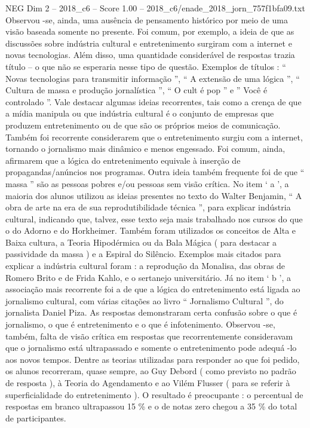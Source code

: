 \begin{textsample}{NEG Dim 2 – 2018\_c6 – Score 1.00 – 2018\_c6/enade\_2018\_jorn\_757f1bfa09.txt}
Observou -se, ainda, uma ausência de pensamento histórico por meio de uma visão baseada somente no presente.
Foi comum, por exemplo, a ideia de que as discussões sobre indústria cultural e entretenimento surgiram com a internet e novas tecnologias.
Além disso, uma quantidade considerável de respostas trazia título – o que não se esperaria nesse tipo de questão.
Exemplos de títulos : “ Novas tecnologias para transmitir informação ”, “ A extensão de uma lógica ”, “ Cultura de massa e produção jornalística ”, “ O cult é pop ” e ” Você é controlado ”.
Vale destacar algumas ideias recorrentes, tais como a crença de que a mídia manipula ou que indústria cultural é o conjunto de empresas que produzem entretenimento ou de que são os próprios meios de comunicação.
Também foi recorrente considerarem que o entretenimento surgiu com a internet, tornando o jornalismo mais dinâmico e menos engessado.
Foi comum, ainda, afirmarem que a lógica do entretenimento equivale à inserção de propagandas/anúncios nos programas.
Outra ideia também frequente foi de que “ massa ” são as pessoas pobres e/ou pessoas sem visão crítica.
No item ‘ a ’, a maioria dos alunos utilizou as ideias presentes no texto do Walter Benjamin, “ A obra de arte na era de sua reprodutibilidade técnica ”, para explicar indústria cultural, indicando que, talvez, esse texto seja mais trabalhado nos cursos do que o do Adorno e do Horkheimer.
Também foram utilizados os conceitos de Alta e Baixa cultura, a Teoria Hipodérmica ou da Bala Mágica ( para destacar a passividade da massa ) e a Espiral do Silêncio.
Exemplos mais citados para explicar a indústria cultural foram : a reprodução da Monalisa, das obras de Romero Brito e de Frida Kahlo, e o sertanejo universitário.
Já no item ‘ b ’, a associação mais recorrente foi a de que a lógica do entretenimento está ligada ao jornalismo cultural, com várias citações ao livro “ Jornalismo Cultural ”, do jornalista Daniel Piza.
As respostas demonstraram certa confusão sobre o que é jornalismo, o que é entretenimento e o que é infotenimento.
Observou -se, também, falta de visão crítica em respostas que recorrentemente consideravam que o jornalismo está ultrapassado e somente o entretenimento pode adequá -lo aos novos tempos.
Dentre as teorias utilizadas para responder ao que foi pedido, os alunos recorreram, quase sempre, ao Guy Debord ( como previsto no padrão de resposta ), à Teoria do Agendamento e ao Vilém Flusser ( para se referir à superficialidade do entretenimento ).
O resultado é preocupante : o percentual de respostas em branco ultrapassou 15 \% e o de notas zero chegou a 35 \% do total de participantes.

\end{textsample}
